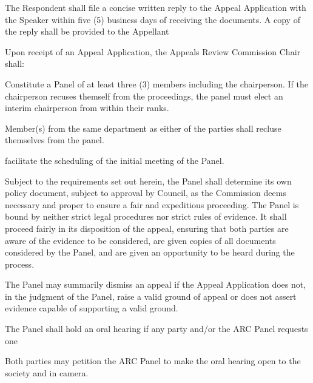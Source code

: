 \begin{longenum}[ label*=\arabic*., align=left]
\begin{longenum}[ label*=\arabic*., align=left]
\item The Respondent shall file a concise written reply to the Appeal Application with the Speaker within five (5) business days of receiving the documents. A copy of the reply shall be provided to the Appellant

\item Upon receipt of  an Appeal Application, the Appeals Review Commission Chair shall:
 \begin{longenum}[ label*=\arabic*., align=left]
			\item Constitute a Panel of at least three (3) members including the chairperson. If the chairperson recuses themself from the proceedings, the panel must elect an interim chairperson from within their ranks.
            
            \begin{longenum}[ label*=\arabic*., align=left]
			\item  Member(s) from the same department as either of the parties shall recluse themselves from the panel.
      \end{longenum}
     \item facilitate the scheduling of the initial meeting of the Panel.       
     \end{longenum}
 	\item Subject  to  the  requirements  set  out  herein,  the  Panel  shall  determine  its  own policy document,  subject  to  approval  by  Council,  as  the  Commission  deems  necessary  and  proper  to ensure a fair and expeditious proceeding. The Panel is bound by neither strict legal procedures nor  strict  rules  of  evidence.  It shall  proceed  fairly  in  its  disposition  of  the  appeal,  ensuring  that both  parties  are  aware  of  the evidence  to  be  considered,  are  given  copies  of  all  documents considered by the Panel, and are given an opportunity to be heard during the process.   
    \item The  Panel  may  summarily  dismiss  an  appeal  if  the  Appeal  Application  does  not,  in  the judgment  of  the  Panel,  raise  a  valid  ground  of  appeal  or  does  not  assert  evidence  capable  of supporting a valid ground.
	\item The Panel shall hold an oral hearing if any party and/or the ARC Panel requests one
    \item Both parties may petition the ARC Panel to make the oral hearing open to the society and in camera.


\end{longenum}
\end{longenum}
